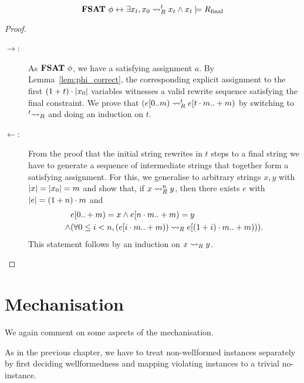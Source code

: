 \begin{theorem}
  \[\textbf{FSAT}~\phi \leftrightarrow \exists x_t, x_0 \rightsquigarrow_{R}^t x_t \land x_t \models R_{\text{final}} \]
\end{theorem}
\begin{proof}\leavevmode
  \begin{description}
    \item[$\rightarrow$:]
      As $\textbf{FSAT}{}~\phi$, we have a satisfying assignment $a$. 
      By Lemma~\ref{lem:phi_correct}, the corresponding explicit assignment to the first $(1 +{t}) \cdot |x_0|$ variables witnesses a valid rewrite sequence satisfying the final constraint. 
      We prove that $(e[0 ..m) \rightsquigarrow_{R}^t e[t \cdot m ..+ m)$ by switching to $\prescript{t}{}{\rightsquigarrow_{R}}$ and doing an induction on $t$.
    \item[$\leftarrow$:]
      From the proof that the initial string rewrites in $t$ steps to a final string we have to generate a sequence of intermediate strings that together form a satisfying assignment. 
      For this, we generalise to arbitrary strings $x, y$ with $|x| = |x_0| = m$ and show that, if $x \rightsquigarrow_{R}^n y$, then there exists $e$ with $|e| = (1 +{n}) \cdot m$ and 
      \begin{align*}
        &e[0..+ m) = x \land e[n \cdot m ..+ m) = y \\
        \land & (\forall 0 \le i < n, (e[i \cdot m ..+ m)) \rightsquigarrow_{R} e[(1 +{i}) \cdot m ..+ m))).
      \end{align*}
      This statement follows by an induction on $x \rightsquigarrow_{R} y$.
  \end{description}
\end{proof}

\section{Mechanisation}
We again comment on some aspects of the mechanisation.

As in the previous chapter, we have to treat non-wellformed instances separately by first deciding wellformedness and mapping violating instances to a trivial no-instance. 

